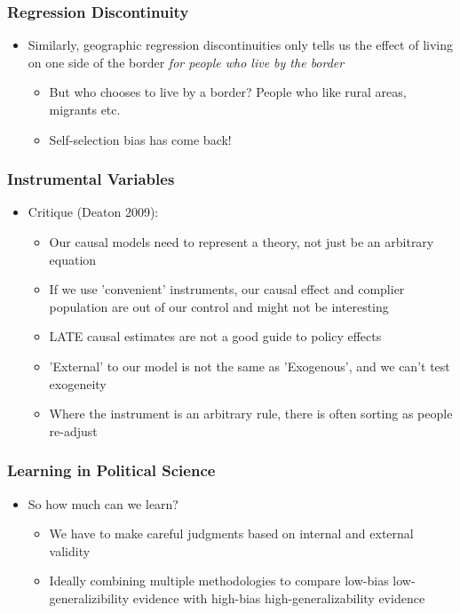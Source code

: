 \documentclass[xcolor=x11names,compress]{beamer}\usepackage[]{graphicx}\usepackage[]{color}
\renewcommand{\(}{\begin{columns}}
\renewcommand{\)}{\end{columns}}
\newcommand{\<}[1]{\begin{column}{#1}}
\renewcommand{\>}{\end{column}}
\begin{document}
\begin{frame}
\frametitle{Regression Discontinuity}
\begin{itemize}
\item Similarly, geographic regression discontinuities only tells us the effect of living on one side of the border \textit{for people who live by the border}
\begin{itemize}
\item But who chooses to live by a border? People who like rural areas, migrants etc.
\item Self-selection bias has come back!
\end{itemize}
\end{itemize}
\end{frame}

\begin{frame}
\frametitle{Instrumental Variables}
\begin{itemize}
\item Critique (Deaton 2009):
\pause
\begin{itemize}
\item Our causal models need to represent a theory, not just be an arbitrary equation
\pause
\item If we use 'convenient' instruments, our causal effect and complier population are out of our control and might not be interesting
\pause
\item LATE causal estimates are not a good guide to policy effects
\pause
\item 'External' to our model is not the same as 'Exogenous', and we can't test exogeneity
\pause
\item Where the instrument is an arbitrary rule, there is often sorting as people re-adjust
\end{itemize}
\end{itemize}
\end{frame}

\begin{frame}
\frametitle{Learning in Political Science}
\begin{itemize}
\item So how much can we learn?
\begin{itemize}
\item We have to make careful judgments based on internal and external validity
\item Ideally combining multiple methodologies to compare low-bias low-generalizibility evidence with high-bias high-generalizability evidence
\end{itemize}
\end{itemize}
\end{frame}
\end{document}
